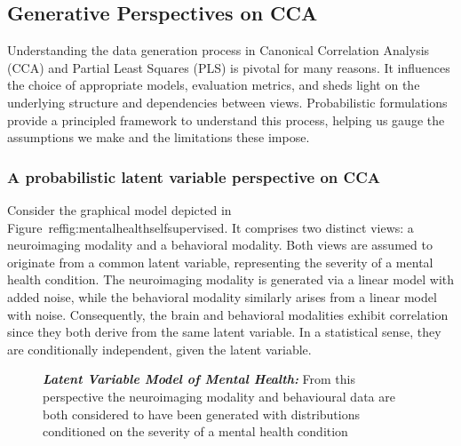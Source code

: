 \subsection{Generative Perspectives on CCA}\label{subsec:generative-perspectives-on-cca}
Understanding the data generation process in Canonical Correlation Analysis (CCA) and Partial Least Squares (PLS) is pivotal for many reasons.
It influences the choice of appropriate models, evaluation metrics, and sheds light on the underlying structure and dependencies between views.
Probabilistic formulations provide a principled framework to understand this process, helping us gauge the assumptions we make and the limitations these impose.

\subsubsection{A probabilistic latent variable perspective on CCA}\label{subsubsec:a-probabilistic-latent-variable-perspective-on-cca}

Consider the graphical model depicted in Figure~ref{fig:mentalhealthselfsupervised}.
It comprises two distinct views: a neuroimaging modality and a behavioral modality.
Both views are assumed to originate from a common latent variable, representing the severity of a mental health condition.
The neuroimaging modality is generated via a linear model with added noise, while the behavioral modality similarly arises from a linear model with noise.
Consequently, the brain and behavioral modalities exhibit correlation since they both derive from the same latent variable.
In a statistical sense, they are conditionally independent, given the latent variable.

\begin{figure}
    \centering
    \caption[Latent Variable Model of Mental Health]{\textit{\textbf{Latent Variable Model of Mental Health:}} From this perspective the neuroimaging modality and behavioural data are both considered to have been generated with distributions conditioned on the severity of a mental health condition}\label{fig:mentalhealthselfsupervised}
\end{figure}


